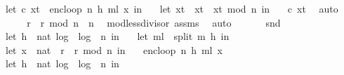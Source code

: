 \begin{isabellebody}
\ \ let\ {\isacharparenleft}{\kern0pt}c{\isacharcomma}{\kern0pt}\ x{\isacharunderscore}{\kern0pt}t{\isacharparenright}{\kern0pt}\ {\isacharequal}{\kern0pt}\ enc{\isacharunderscore}{\kern0pt}loop\ {\isacharparenleft}{\kern0pt}n{\isacharcomma}{\kern0pt}\ h{\isacharcomma}{\kern0pt}\ m{\isacharunderscore}{\kern0pt}l{\isacharparenright}{\kern0pt}\ x{\isacharunderscore}{\kern0pt}{}\ in\ \isanewline
\ \ let\ x{\isacharunderscore}{\kern0pt}t{\isacharprime}{\kern0pt}\ {\isacharequal}{\kern0pt}\ x{\isacharunderscore}{\kern0pt}t\ {\isacharasterisk}{\kern0pt}\ x{\isacharunderscore}{\kern0pt}t\ mod\ n\ in\ \isanewline
\ \ {\isacharparenleft}{\kern0pt}c{\isacharcomma}{\kern0pt}\ x{\isacharunderscore}{\kern0pt}t{\isacharprime}{\kern0pt}{\isacharparenright}{\kern0pt}{\isacharparenright}{\kern0pt}{\isachardoublequoteclose}\ \isamarkupfalse%
\ auto\isanewline
\ \ \isanewline
\ \ \isamarkupfalse%
\ {\isachardoublequoteopen}r\ {\isacharasterisk}{\kern0pt}\ r\ mod\ n\ {\isacharless}{\kern0pt}\ n{\isachardoublequoteclose}\ \isamarkupfalse%
\ mod{\isacharunderscore}{\kern0pt}less{\isacharunderscore}{\kern0pt}divisor\ assms{\isacharparenleft}{\kern0pt}{}{\isacharparenright}{\kern0pt}\ \isamarkupfalse%
\ auto\isanewline
\isanewline
\ \ \isamarkupfalse%
\ \isamarkupfalse%
\ \ {\isachardoublequoteopen}snd\ {\isacharparenleft}{\kern0pt}\isanewline
\ \ let\ h\ {\isacharequal}{\kern0pt}\ nat\ {\isasymlfloor}log\ {}\ {\isacharparenleft}{\kern0pt}log\ {}\ n{\isacharparenright}{\kern0pt}{\isasymrfloor}\ in\ \isanewline
\ \ let\ m{\isacharunderscore}{\kern0pt}l\ {\isacharequal}{\kern0pt}\ split\ m\ h\ in\ \isanewline
\ \ let\ {\isacharparenleft}{\kern0pt}x{\isacharunderscore}{\kern0pt}{}\ {\isacharcolon}{\kern0pt}{\isacharcolon}{\kern0pt}\ nat{\isacharparenright}{\kern0pt}\ {\isacharequal}{\kern0pt}\ {\isacharparenleft}{\kern0pt}r\ {\isacharasterisk}{\kern0pt}\ r{\isacharparenright}{\kern0pt}\ mod\ n\ in\ \isanewline
\ \ enc{\isacharunderscore}{\kern0pt}loop\ {\isacharparenleft}{\kern0pt}n{\isacharcomma}{\kern0pt}\ h{\isacharcomma}{\kern0pt}\ m{\isacharunderscore}{\kern0pt}l{\isacharparenright}{\kern0pt}\ x{\isacharunderscore}{\kern0pt}{}{\isacharparenright}{\kern0pt}\ {\isacharequal}{\kern0pt}\ \isanewline
\ \ {\isacharparenleft}{\kern0pt}let\ h\ {\isacharequal}{\kern0pt}\ nat\ {\isasymlfloor}log\ {}\ {\isacharparenleft}{\kern0pt}log\ {}\ n{\isacharparenright}{\kern0pt}{\isasymrfloor}\ in\ \isanewline

\end{isabellebody}

